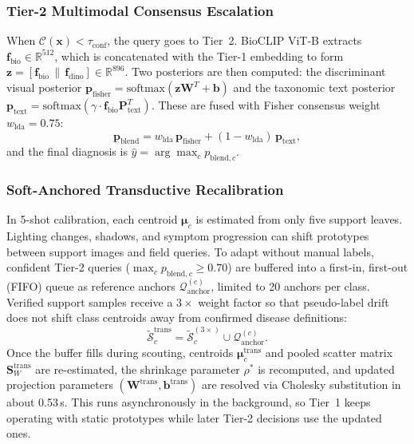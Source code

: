 \documentclass[preprint,12pt]{elsarticle}
\begin{document}
\subsubsection{Tier-2 Multimodal Consensus Escalation}
When $\mathcal{C}(\mathbf{x}) < \tau_{\text{conf}}$, the query goes to Tier~2. BioCLIP ViT-B extracts $\mathbf{f}_{\text{bio}} \in \mathbb{R}^{512}$, which is concatenated with the Tier-1 embedding to form $\mathbf{z} = [\mathbf{f}_{\text{bio}} \,\|\, \mathbf{f}_{\text{dino}}] \in \mathbb{R}^{896}$. Two posteriors are then computed: the discriminant visual posterior $\mathbf{p}_{\text{fisher}} = \text{softmax}(\mathbf{z}\mathbf{W}^T + \mathbf{b})$ and the taxonomic text posterior $\mathbf{p}_{\text{text}} = \text{softmax}(\gamma \cdot \mathbf{f}_{\text{bio}}\mathbf{P}_{\text{text}}^T)$. These are fused with Fisher consensus weight $w_{\text{lda}} = 0.75$:
\begin{equation}
    \label{eq:multimodal_blend}
    \mathbf{p}_{\text{blend}} = w_{\text{lda}} \, \mathbf{p}_{\text{fisher}} + (1 - w_{\text{lda}}) \, \mathbf{p}_{\text{text}},
\end{equation}
and the final diagnosis is $\hat{y} = \arg\max_c p_{\text{blend}, c}$.

\subsubsection{Soft-Anchored Transductive Recalibration}
\label{sec:transductive}
In 5-shot calibration, each centroid $\boldsymbol{\mu}_c$ is estimated from only five support leaves. Lighting changes, shadows, and symptom progression can shift prototypes between support images and field queries. To adapt without manual labels, confident Tier-2 queries ($\max_c p_{\text{blend}, c} \ge 0.70$) are buffered into a first-in, first-out (FIFO) queue as reference anchors $\mathcal{Q}_{\text{anchor}}^{(c)}$, limited to 20 anchors per class. Verified support samples receive a $3\times$ weight factor so that pseudo-label drift does not shift class centroids away from confirmed disease definitions:
\begin{equation}
    \label{eq:transductive_set}
    \tilde{\mathcal{S}}_c^{\text{trans}} = \tilde{\mathcal{S}}_c^{(3\times)} \cup \mathcal{Q}_{\text{anchor}}^{(c)}.
\end{equation}
Once the buffer fills during scouting, centroids $\boldsymbol{\mu}_c^{\text{trans}}$ and pooled scatter matrix $\mathbf{S}_W^{\text{trans}}$ are re-estimated, the shrinkage parameter $\rho^*$ is recomputed, and updated projection parameters $(\mathbf{W}^{\text{trans}}, \mathbf{b}^{\text{trans}})$ are resolved via Cholesky substitution in about 0.53\,s. This runs asynchronously in the background, so Tier~1 keeps operating with static prototypes while later Tier-2 decisions use the updated ones.
\end{document}
